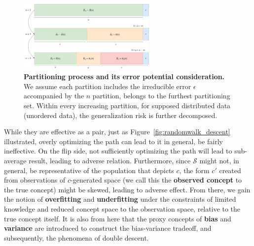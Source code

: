 \documentclass{article}
\begin{document}

\begin{figure}
  \includegraphics[width=0.6\textwidth]{mamamia.png}
  \caption{\textbf{Partitioning process and its error potential consideration.} We assume each partition includes the irreducible error $\epsilon$ accompanied by the $n$ partition, belongs to the furthest partitioning set. Within every increasing partition, for supposed distributed data (unordered data), the generalization risk is further decomposed.}
\end{figure}

While they are effective as a pair, just as Figure~\ref{fig:randomwalk_descent} illustrated, overly optimizing the path can lead to it in general, be fairly ineffective. On the flip side, not sufficiently optimizing the path will lead to sub-average result, leading to adverse relation. Furthermore, since $\mathcal{S}$ might not, in general, be representative of the population that depicts $c$, the form $c'$ created from observations of $c$-generated space (we call this the \textbf{observed concept} to the true concept) might be skewed, leading to adverse effect. From there, we gain the notion of \textbf{overfitting} and \textbf{underfitting} under the constraints of limited knowledge and reduced concept space to the observation space, relative to the true concept itself. It is also from here that the proxy concepts of \textbf{bias} and \textbf{variance} are introduced to construct the bias-variance tradeoff, and subsequently, the phenomena of double descent. 
\end{document}
